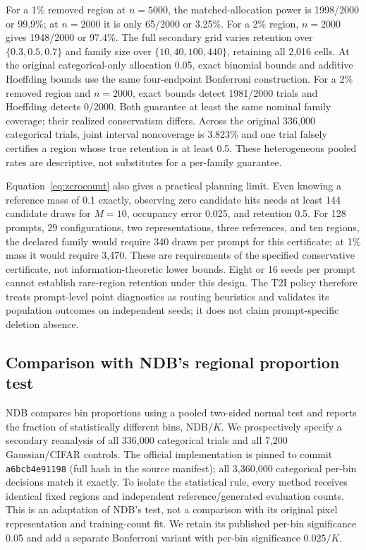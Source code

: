 For a 1\% removed region at $n=5000$, the matched-allocation power is
1998/2000 or 99.9\%; at $n=2000$ it is only 65/2000 or 3.25\%.
For a 2\% region, $n=2000$ gives 1948/2000 or 97.4\%.
The full secondary grid varies retention over $\{0.3,0.5,0.7\}$ and family size
over $\{10,40,100,440\}$, retaining all 2,016 cells.
At the original categorical-only allocation 0.05, exact binomial bounds and
additive Hoeffding bounds use the same four-endpoint Bonferroni construction.
For a 2\% removed region and $n=2000$, exact bounds detect 1981/2000 trials and
Hoeffding detects 0/2000. Both guarantee at least the same nominal family
coverage; their realized conservatism differs. Across the original 336,000
categorical trials, joint interval noncoverage is 3.823\% and one trial falsely
certifies a region whose true retention is at least 0.5. These heterogeneous
pooled rates are descriptive, not substitutes for a per-family guarantee.

Equation~\ref{eq:zerocount} also gives a practical planning limit. Even knowing
a reference mass of 0.1 exactly, observing zero candidate hits needs at least
144 candidate draws for $M=10$, occupancy error 0.025, and retention 0.5.
For 128 prompts, 29 configurations, two representations, three references, and
ten regions, the declared family would require 340 draws per prompt for this
certificate; at 1\% mass it would require 3,470. These are requirements of the specified
conservative certificate, not information-theoretic lower bounds. Eight or
16 seeds per prompt cannot establish rare-region retention under this design.
The T2I policy therefore treats prompt-level point diagnostics as routing
heuristics and validates its population outcomes on independent seeds; it
does not claim prompt-specific deletion absence.

\subsection{Comparison with NDB's regional proportion test}
NDB\cite{richardson2018ndb} compares bin proportions using a pooled two-sided
normal test and reports the fraction of statistically different bins, NDB/$K$.
We prospectively specify a secondary reanalysis of all 336,000 categorical
trials and all 7,200 Gaussian/CIFAR controls. The official implementation is
pinned to commit \texttt{a6bcb4e91198} (full hash in the source manifest); all
3,360,000 categorical per-bin decisions match it exactly. To isolate the
statistical rule, every method receives identical fixed regions and independent
reference/generated evaluation counts. This is an adaptation of NDB's test,
not a comparison with its original pixel representation and training-count fit.
We retain its published per-bin significance 0.05 and add a separate
Bonferroni variant with per-bin significance $0.025/K$.

